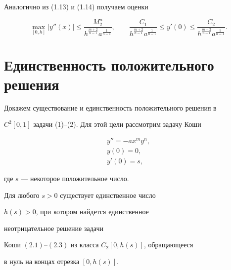 Аналогично из (1.13) и (1.14) получаем оценки


$$


\max_{[0, h]}|y''(x)|


\le \frac{M_2^n}{h^{\frac{m+2}{n-1}}a^{\frac{1}{n-1}}},\qquad


\frac{C_1}{h^{\frac{m+2}{n-1}}a^{\frac{1}{n-1}}}


\le y'(0) \le \frac{ C_2}{h^{\frac{m+2}{n-1}}a^{\frac{1}{n-1}}}.


$$





\section{Единственность положительного решения}





Докажем существование и единственность положительного решения в


$C^2[0, 1]$ задачи (1)--(2). Для этой цели рассмотрим задачу Коши


\begin{gather}


y'' = -ax^my^n,\\


y(0) = 0,\\


y'(0) = s,


\end{gather}


где $s$ --- некоторое положительное число.





\begin{thms} Для любого $s>0$ существует единственное число


$h(s) > 0$, при котором найдется единственное 


неотрицательное решение задачи 


Коши $(2.1)$--$(2.3)$ из класса $C_2[0,h(s)] $, обращающееся


в нуль на концах отрезка $[0, h(s)]$.


\end{thms}





